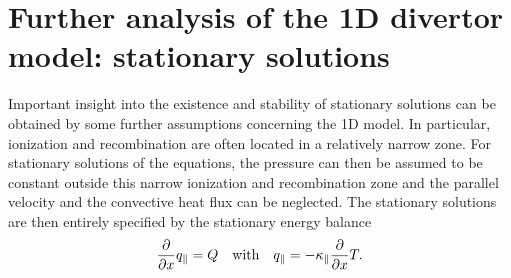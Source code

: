 \documentclass[amsmath,amssymb,a4]{revtex4-2}
\begin{document}
\section{Further analysis of the 1D divertor model: stationary solutions}
Important insight into the existence and stability of stationary solutions can be obtained by some further assumptions concerning the 1D model. In particular, ionization and recombination are often located in a relatively narrow zone. For stationary solutions of the equations, the pressure can then be assumed to be constant outside this narrow ionization and recombination zone and the parallel velocity and the convective heat flux can be neglected. The stationary solutions are then entirely specified by the stationary energy balance
\begin{equation}\label{stationary_energy_balance}
    {\partial \over \partial x} q_\parallel = Q \quad\hbox{with}\quad q_\parallel = - \kappa_\parallel {\partial \over \partial x} T.
\end{equation}
\end{document}
